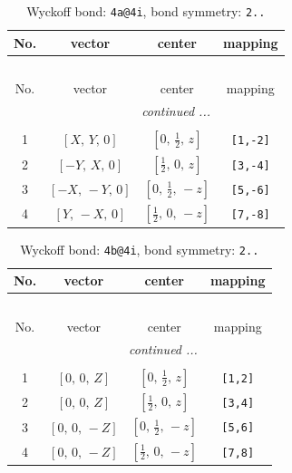 \documentclass[fleqn,8pt]{jsarticle}
\begin{document}
\begin{longtable}{cccc}
\caption{Wyckoff bond: {\tt 4a@4i}, bond symmetry: {\tt 2..}}
 \\
 \hline \hline
No. & vector & center & mapping \\ \hline \endfirsthead

\multicolumn{3}{l}{\tablename\ \thetable{}} \\
 \hline \hline
No. & vector & center & mapping \\ \hline \endhead

 \hline \hline
\multicolumn{3}{r}{\footnotesize\it continued ...} \\ \endfoot

 \hline \hline
\multicolumn{3}{r}{} \\ \endlastfoot

1 & $\left[ X,\, Y,\, 0 \right]$ & $\left[ 0,\, \frac{1}{2},\, z \right]$ & {\tt [1,-2]} \\ \hline
2 & $\left[ - Y,\, X,\, 0 \right]$ & $\left[ \frac{1}{2},\, 0,\, z \right]$ & {\tt [3,-4]} \\ \hline
3 & $\left[ - X,\, - Y,\, 0 \right]$ & $\left[ 0,\, \frac{1}{2},\, - z \right]$ & {\tt [5,-6]} \\ \hline
4 & $\left[ Y,\, - X,\, 0 \right]$ & $\left[ \frac{1}{2},\, 0,\, - z \right]$ & {\tt [7,-8]} \\
\end{longtable}
\renewcommand{\arraystretch}{1.2}
\begin{longtable}{cccc}
\caption{Wyckoff bond: {\tt 4b@4i}, bond symmetry: {\tt 2..}}
 \\
 \hline \hline
No. & vector & center & mapping \\ \hline \endfirsthead

\multicolumn{3}{l}{\tablename\ \thetable{}} \\
 \hline \hline
No. & vector & center & mapping \\ \hline \endhead

 \hline \hline
\multicolumn{3}{r}{\footnotesize\it continued ...} \\ \endfoot

 \hline \hline
\multicolumn{3}{r}{} \\ \endlastfoot

1 & $\left[ 0,\, 0,\, Z \right]$ & $\left[ 0,\, \frac{1}{2},\, z \right]$ & {\tt [1,2]} \\ \hline
2 & $\left[ 0,\, 0,\, Z \right]$ & $\left[ \frac{1}{2},\, 0,\, z \right]$ & {\tt [3,4]} \\ \hline
3 & $\left[ 0,\, 0,\, - Z \right]$ & $\left[ 0,\, \frac{1}{2},\, - z \right]$ & {\tt [5,6]} \\ \hline
4 & $\left[ 0,\, 0,\, - Z \right]$ & $\left[ \frac{1}{2},\, 0,\, - z \right]$ & {\tt [7,8]} \\
\end{longtable}
\end{document}
